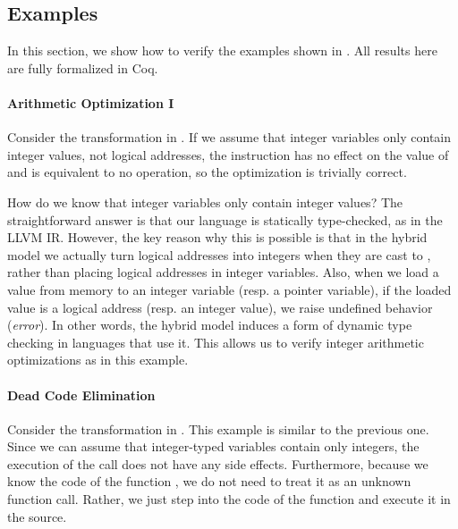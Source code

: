 \subsection{Examples}
\label{sec:intptrcast:compiler-verification:examples}

In this section, we show how to verify the examples shown in .  All
results here are fully formalized in Coq.

\paragraph{Arithmetic Optimization I}

Consider the transformation in . If we assume that
integer variables only contain integer values, not logical addresses, the instruction  has no effect on the value of  and is equivalent to no operation, so
the optimization is trivially correct.

How do we know that integer variables only contain
integer values? The straightforward answer is that our language is statically type-checked, as in the LLVM IR. However, the key reason why this is possible
is that in the hybrid model we actually turn logical addresses into integers
when they are cast to , rather than placing logical addresses in integer
variables. Also, when we load a value from memory to an integer 
variable (resp. a pointer variable), 
if the loaded value is a logical address (resp. an integer value), we raise undefined
behavior (\ie \emph{error}).
In other words, the hybrid model induces a form of dynamic type
checking in languages that use it. This allows us to verify integer
arithmetic optimizations as in this example.

\paragraph{Dead Code Elimination}

Consider the transformation in .  This example
is similar to the previous one.  Since we can assume that integer-typed
variables contain only integers, the execution of the call
 does not have any side effects.
Furthermore, because we know the code of the function
, we do not need to treat it as an unknown function call.
Rather, we just step into the code of the function  and
execute it in the source.%


